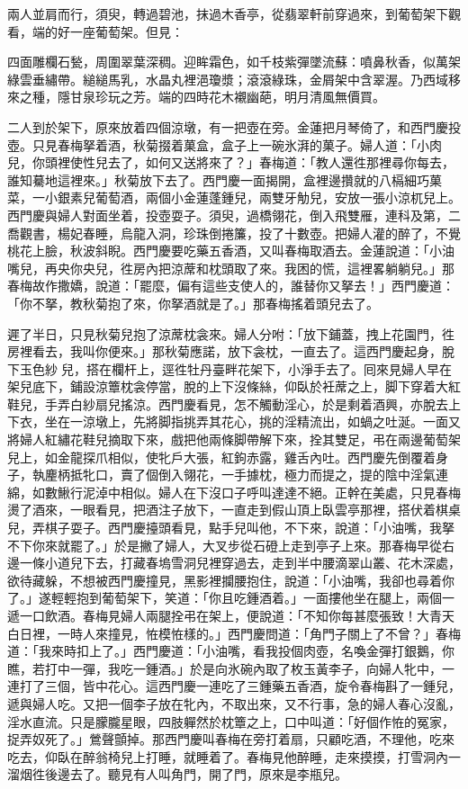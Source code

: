 兩人並肩而行，須臾，轉過碧池，抹過木香亭，從翡翠軒前穿過來，到葡萄架下觀看，端的好一座葡萄架。但見：

\begin{myquote} 
四面雕欄石甃，周圍翠葉深稠。迎眸霜色，如千枝紫彈墜流蘇：噴鼻秋香，似萬架綠雲垂繡帶。縋縋馬乳，水晶丸裡浥瓊漿；滾滾綠珠，金屑架中含翠渥。乃西域移來之種，隱甘泉珍玩之芳。端的四時花木襯幽葩，明月清風無價買。
\end{myquote}

二人到於架下，原來放着四個涼墩，有一把壺在旁。金蓮把月琴倚了，{}和西門慶投壺。只見春梅拏着酒，秋菊掇着菓盒，盒子上一碗氷湃的菓子。婦人道：「小肉兒，你頭裡使性兒去了，如何又送將來了？」春梅道：「教人還徃那裡尋你每去，誰知驀地這裡來。」秋菊放下去了。西門慶一面揭開，盒裡邊攢就的八槅細巧菓菜，一小銀素兒葡萄酒，兩個小金蓮蓬鍾兒，兩雙牙觔兒，安放一張小涼杌兒上。西門慶與婦人對面坐着，投壺耍子。須臾，過橋翎花，倒入飛雙雁，連科及第，二喬觀書，楊妃春睡，烏龍入洞，珍珠倒捲簾，投了十數壺。把婦人灌的醉了，不覺桃花上臉，秋波斜睨。西門慶要吃藥五香酒，又叫春梅取酒去。金蓮說道：「小油嘴兒，再央你央兒，{}徃房內把涼蓆和枕頭取了來。我困的慌，這裡畧躺躺兒。」那春梅故作撒嬌，說道：「罷麼，偏有這些支使人的，誰替你又拏去！」西門慶道：「你不拏，{}教秋菊抱了來，你拏酒就是了。」那春梅搖着頭兒去了。

遲了半日，只見秋菊兒抱了涼蓆枕衾來。婦人分咐：「放下鋪蓋，拽上花園門，徃房裡看去，我叫你便來。」那秋菊應諾，放下衾枕，一直去了。這西門慶起身，脫下玉色紗𧜽兒，搭在欄杆上，逕徃牡丹臺畔花架下，小淨手去了。囘來見婦人早在架兒底下，鋪設涼簟枕衾停當，脫的上下沒條絲，仰臥於衽蓆之上，脚下穿着大紅鞋兒，手弄白紗扇兒搖涼。西門慶看見，怎不觸動淫心，於是剩着酒興，亦脫去上下衣，坐在一涼墩上，先將脚指挑弄其花心，挑的淫精流出，如蝸之吐涎。一面又將婦人紅繡花鞋兒摘取下來，戲把他兩條脚帶解下來，拴其雙足，弔在兩邊葡萄架兒上，如金龍探爪相似，使牝戶大張，紅鉤赤露，雞舌內吐。西門慶先倒覆着身子，執麈柄抵牝口，賣了個倒入翎花，一手據枕，極力而提之，提的陰中淫氣連綿，如數鰍行泥淖中相似。婦人在下沒口子呼叫達達不絕。正幹在美處，只見春梅燙了酒來，一眼看見，把酒注子放下，一直走到假山頂上臥雲亭那裡，搭伏着棋桌兒，弄棋子耍子。西門慶擡頭看見，點手兒叫他，不下來，說道：「小油嘴，我拏不下你來就罷了。」於是撇了婦人，大叉步從石磴上走到亭子上來。那春梅早從右邊一條小道兒下去，打藏春塢雪洞兒裡穿過去，走到半中腰滴翠山叢、花木深處，欲待藏躲，{}不想被西門慶撞見，黑影裡攔腰抱住，說道：「小油嘴，我卻也尋着你了。」遂輕輕抱到葡萄架下，笑道：「你且吃鍾酒着。」一面摟他坐在腿上，兩個一遞一口飲酒。春梅見婦人兩腿拴弔在架上，便說道：「不知你每甚麼張致！大青天白日裡，一時人來撞見，恠模恠樣的。」西門慶問道：「角門子關上了不曾？」春梅道：「我來時扣上了。」西門慶道：「小油嘴，看我投個肉壺，名喚金彈打銀鵝，你瞧，若打中一彈，我吃一鍾酒。」於是向氷碗內取了枚玉黃李子，向婦人牝中，一連打了三個，皆中花心。{}這西門慶一連吃了三鍾藥五香酒，旋令春梅斟了一鍾兒，遞與婦人吃。又把一個李子放在牝內，不取出來，又不行事，急的婦人春心沒亂，淫水直流。只是朦朧星眼，四肢軃然於枕簟之上，{}口中叫道：「好個作恠的冤家，捉弄奴死了。」鶯聲顫掉。那西門慶叫春梅在旁打着扇，只顧吃酒，不理他，{}吃來吃去，仰臥在醉翁椅兒上打睡，就睡着了。{}春梅見他醉睡，走來摸摸，打雪洞內一溜烟徃後邊去了。聽見有人叫角門，開了門，原來是李瓶兒。{}

